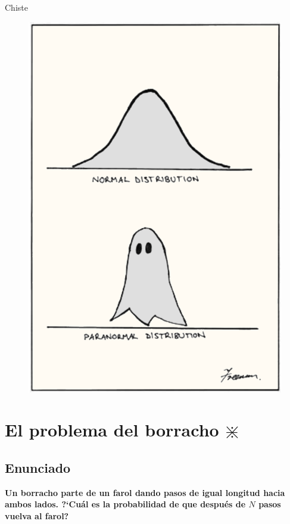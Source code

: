 \begin{myexampleblock}{Chiste}
	\begin{figure}[H]
	\centering
	\includegraphics[width=.65\textwidth]{imagenes/apendices/app15.png}
	\end{figure}
\end{myexampleblock}


\newpage














\chapter{El problema del borracho $\divideontimes$} 



\section*{Enunciado}

\begin{ejemplo}
\textbf{Un borracho parte de un farol dando pasos de igual longitud hacia ambos lados. ?`Cuál es la probabilidad de que después de $N$ pasos vuelva al farol?}
\end{ejemplo}


